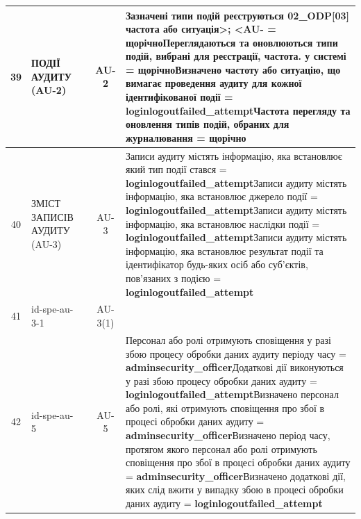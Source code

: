 \documentclass[10pt]{article}
\begin{document}
\begin{longtable}{|c|>{\raggedright\arraybackslash}p{2.5cm}|>{\raggedright\arraybackslash}p{4.5cm}|c|>{\raggedright\arraybackslash}p{4.5cm}|}
39 & ПОДІЇ АУДИТУ (AU-2) &  & AU-2 & Зазначені типи подій реєструються 02\_\allowbreak{}ODP[03] частота або ситуація>; <AU- = \textbf{щорічно}\newline Переглядаються та оновлюються типи подій, вибрані для реєстрації, частота. у системі = \textbf{щорічно}\newline Визначено частоту або ситуацію, що вимагає проведення аудиту для кожної ідентифікованої події = \textbf{loginlogoutfailed\_\allowbreak{}attempt}\newline Частота перегляду та оновлення типів подій, обраних для журналювання = \textbf{щорічно} \\ \hline
40 & ЗМІСТ ЗАПИСІВ АУДИТУ (AU-3) &  & AU-3 & Записи аудиту містять інформацію, яка встановлює який тип події стався = \textbf{loginlogoutfailed\_\allowbreak{}attempt}\newline Записи аудиту містять інформацію, яка встановлює джерело події = \textbf{loginlogoutfailed\_\allowbreak{}attempt}\newline Записи аудиту містять інформацію, яка встановлює наслідки події = \textbf{loginlogoutfailed\_\allowbreak{}attempt}\newline Записи аудиту містять інформацію, яка встановлює результат події та ідентифікатор будь-яких осіб або суб'єктів, пов'язаних з подією = \textbf{loginlogoutfailed\_\allowbreak{}attempt} \\ \hline
41 & id-spe-au-3-1 &  & AU-3(1) &  \\ \hline
42 & id-spe-au-5 &  & AU-5 & Персонал або ролі отримують сповіщення у разі збою процесу обробки даних аудиту періоду часу = \textbf{adminsecurity\_\allowbreak{}officer}\newline Додаткові дії виконуються у разі збою процесу обробки даних аудиту = \textbf{loginlogoutfailed\_\allowbreak{}attempt}\newline Визначено персонал або ролі, які отримують сповіщення про збої в процесі обробки даних аудиту  = \textbf{adminsecurity\_\allowbreak{}officer}\newline Визначено період часу, протягом якого персонал або ролі отримують сповіщення про збої в процесі обробки даних аудиту = \textbf{adminsecurity\_\allowbreak{}officer}\newline Визначено додаткові дії, яких слід вжити у випадку збою в процесі обробки даних аудиту  = \textbf{loginlogoutfailed\_\allowbreak{}attempt} \\ \hline

\end{longtable}
\end{document}
